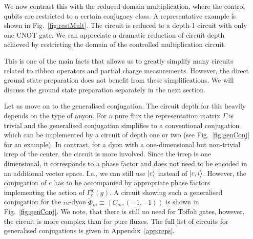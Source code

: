 \documentclass[a4paper,twocolumn,11pt, accepted=2024-06-14]{quantumarticle}
\begin{document}
We now contrast this with the reduced domain multiplication, where the control qubits are restricted to a certain conjugacy class. A representative example is shown in Fig.~\ref{fig:restMult}. The circuit is reduced to a depth-1 circuit with only one CNOT gate. We can appreciate a dramatic reduction of circuit depth achieved by restricting the domain of the controlled multiplication circuit.

This is one of the main facts that allows us to greatly simplify many circuits related to ribbon operators and partial charge measurements. However, the direct ground state preparation does not benefit from these simplifications. We will discuss the ground state preparation separately in the next section.



Let us move on to the generalised conjugation. The circuit depth for this heavily depends on the type of anyon. For a pure flux the representation matrix $\Gamma$ is trivial and the generalised conjugation simplifies to a conventional conjugation which can be implemented by a circuit of depth one or two (see Fig.~\ref{fig:genConj} for an example). In contrast, for a dyon with a one-dimensional but non-trivial irrep of the center, the circuit is more involved. Since the irrep is one dimensional, it corresponds to a phase factor and does not need to be encoded in an additional vector space. I.e., we can still use $\ket{c}$ instead of $\ket{c,i}$. However, the conjugation of $c$ has to be accompanied by appropriate phase factors implementing the action of $\Gamma^\chi_c(g)$. A circuit showing such a generalised conjugation for the $m$-dyon $\tilde{\Phi}_m \equiv (C_m, (-1, -1))$ is shown in Fig.~\ref{fig:genConj}. We note, that there is still no need for Toffoli gates, however, the circuit is more complex than for pure fluxes. The full list of circuits for generalised conjugations is given in Appendix~\ref{app:reps}.
\end{document}
